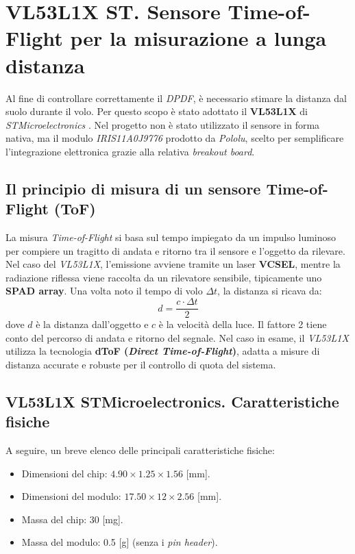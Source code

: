 \documentclass[11pt]{report}
\begin{document}
	\section{VL53L1X ST. Sensore Time-of-Flight per la misurazione a lunga distanza}
	Al fine di controllare correttamente il \textit{DPDF}, è necessario stimare la distanza dal suolo durante il volo. Per questo scopo è stato adottato il \textbf{VL53L1X} di \textit{STMicroelectronics} \cite{vl53l1x_ds}. Nel progetto non è stato utilizzato il sensore in forma nativa, ma il modulo \textit{IRIS11A0J9776} prodotto da \textit{Pololu}, scelto per semplificare l'integrazione elettronica grazie alla relativa \textit{breakout board}.
	
	\subsection{Il principio di misura di un sensore Time-of-Flight (ToF)}
	La misura \textit{Time-of-Flight} si basa sul tempo impiegato da un impulso luminoso per compiere un tragitto di andata e ritorno tra il sensore e l'oggetto da rilevare. Nel caso del \textit{VL53L1X}, l'emissione avviene tramite un laser \textbf{VCSEL}, mentre la radiazione riflessa viene raccolta da un rilevatore sensibile, tipicamente uno \textbf{SPAD array}. Una volta noto il tempo di volo $\Delta t$, la distanza si ricava da:
	\begin{equation}
		d = \frac{c \cdot \Delta t}{2}
		\label{eq:tof}
	\end{equation}
	dove $d$ è la distanza dall'oggetto e $c$ è la velocità della luce. Il fattore 2 tiene conto del percorso di andata e ritorno del segnale. Nel caso in esame, il \textit{VL53L1X} utilizza la tecnologia \textbf{dToF (\textit{Direct Time-of-Flight})}, adatta a misure di distanza accurate e robuste per il controllo di quota del sistema.
	
	\subsection{VL53L1X STMicroelectronics. Caratteristiche fisiche}
	A seguire, un breve elenco delle principali caratteristiche fisiche:
	\begin{itemize}
		\item Dimensioni del chip: $4.90\times 1.25\times 1.56$ [mm].
		\item Dimensioni del modulo: $17.50\times 12\times 2.56$ [mm].
		\item Massa del chip: 30 [mg].
		\item Massa del modulo: 0.5 [g] (senza i \textit{pin header}).
	\end{itemize}
	
\end{document}

